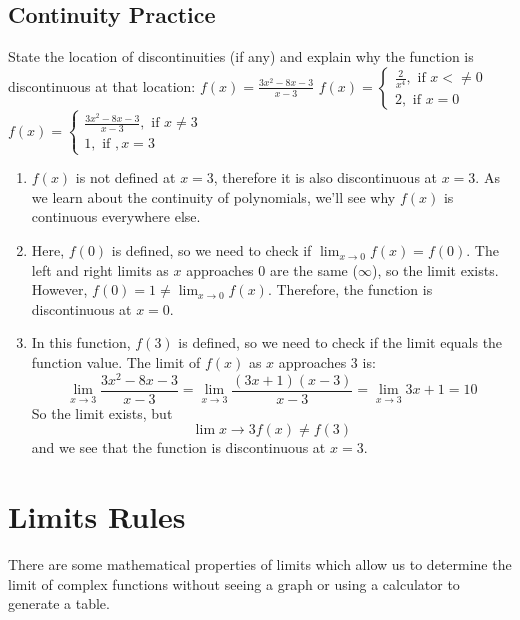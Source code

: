 \subsection{Continuity Practice}
\begin{Exercise}[title=Limits Practice 5, label=limits5]
State the location of discontinuities (if any) and explain why the function is 
discontinuous at that location:
    \Question $f(x) = \frac{3x^2-8x-3}{x-3}$
    \Question $f(x) = \begin{cases}
    \frac{2}{x^4}, \text{ if } x <\neq 0\\
    2, \text{ if } x=0
    \end{cases}$
    \Question $f(x) = \begin{cases}
        \frac{3x^2-8x-3}{x-3}, \text{ if } x \neq 3\\
        1, \text{ if }, x=3
    \end{cases}$
\end{Exercise}
\begin{Answer}[ref=limits5]
    \begin{enumerate}
    \item $f(x)$ is not defined at $x = 3$, therefore it is also discontinuous at $x = 3$. As we learn about the continuity of polynomials, we'll see why $f(x)$ is continuous everywhere else. 
    \item Here, $f(0)$ is defined, so we need to check if $\lim_{x \to 0}f(x) = f(0)$. The left and right limits as $x$ approaches $0$ are the same ($\infty$), so the limit exists. However, $f(0) = 1 \neq \lim_{x\to 0}f(x)$. Therefore, the function is discontinuous at $x=0$.
    \item In this function, $f(3)$ is defined, so we need to check if the limit equals the function value. The limit of $f(x)$ as $x$ approaches $3$ is: $$\lim_{x \to 3}\frac{3x^2-8x-3}{x-3} = \lim_{x \to 3}\frac{(3x+1)(x-3)}{x-3} = \lim_{x \to 3}3x+1 = 10$$ So the limit exists, but $$\lim{x \to 3}f(x) \neq f(3)$$ and we see that the function is discontinuous at $x=3$.
\end{enumerate}
\vspace{40mm}
\end{Answer}


\section{Limits Rules}
There are some mathematical properties of limits which allow us to determine the 
limit of complex functions without seeing a graph or using a calculator to generate 
a table. 

